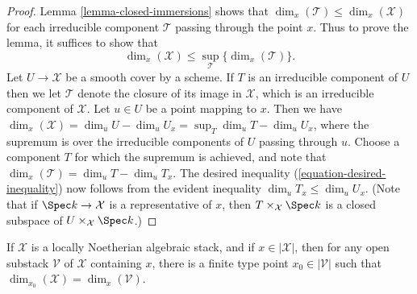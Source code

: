\begin{proof}
Lemma \ref{lemma-closed-immersions}
shows that
$\dim_x (\mathcal{T}) \leq \dim_x(\mathcal{X})$ for each
irreducible component $\mathcal{T}$ passing through
the point $x$.   Thus to prove the lemma,
it suffices to show that
\begin{equation}
\label{equation-desired-inequality}
\dim_x(\mathcal{X}) \leq
\sup_{\mathcal{T}} \{\dim_x(\mathcal{T})\}.
\end{equation}
Let $U\to\mathcal{X}$ be a smooth cover by a scheme. If $T$ is an irreducible
component of $U$ then we let $\mathcal{T}$ denote the closure of its image
in $\mathcal{X}$, which is an irreducible component of $\mathcal{X}$. Let
$u \in U$ be
a point mapping to $x$. Then we have
$\dim_x(\mathcal{X})=\dim_uU-\dim_uU_x=\sup_T\dim_uT-\dim_uU_x$, where the
supremum is over the irreducible components of $U$ passing
through $u$. Choose a component $T$ for which the supremum
is achieved, and note that
$\dim_x(\mathcal{T})=\dim_uT-\dim_u T_x$.
The desired inequality (\ref{equation-desired-inequality})
now follows from the evident inequality $\dim_u T_x \leq \dim_u U_x.$
(Note that if $\Spec k \to \mathcal{X}$ is a representative of $x$,
then $T\times_{\mathcal{X}} \Spec k$ is a closed subspace of
$U\times_{\mathcal{X}}
\Spec k$.)
\end{proof}

\begin{lemma}
\label{lemma-dimension-at-finite-type-point}
If $\mathcal{X}$ is a locally Noetherian algebraic stack, and if
$x \in |\mathcal{X}|$, then
for any open substack $\mathcal{V}$ of $\mathcal{X}$ containing $x$,
there is a finite type point $x_0 \in |\mathcal{V}|$ such that
$\dim_{x_0}(\mathcal{X}) = \dim_x(\mathcal{V})$.
\end{lemma}


